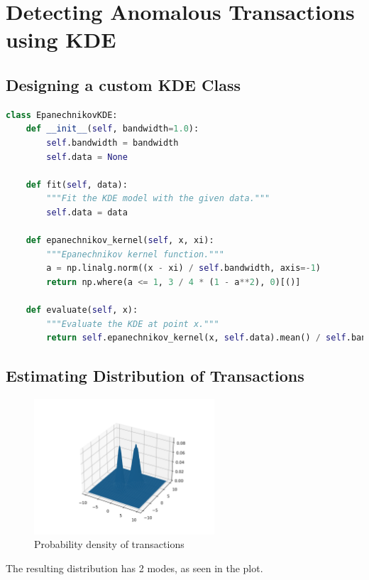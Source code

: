 \section{Detecting Anomalous Transactions using KDE}
\subsection{Designing a custom KDE Class}
\begin{lstlisting}[language=Python, caption={Python code to implement \texttt{EpanechnikovKDE} class}, label=lst:epanechnikovkde]
class EpanechnikovKDE:
    def __init__(self, bandwidth=1.0):
        self.bandwidth = bandwidth
        self.data = None

    def fit(self, data):
        """Fit the KDE model with the given data."""
        self.data = data

    def epanechnikov_kernel(self, x, xi):
        """Epanechnikov kernel function."""
        a = np.linalg.norm((x - xi) / self.bandwidth, axis=-1)
        return np.where(a <= 1, 3 / 4 * (1 - a**2), 0)[()]

    def evaluate(self, x):
        """Evaluate the KDE at point x."""
        return self.epanechnikov_kernel(x, self.data).mean() / self.bandwidth
\end{lstlisting}

\subsection{Estimating Distribution of Transactions}
\vspace{-20pt}
\begin{figure}[H]
	\centering
	\includegraphics[width=0.6\textwidth]{images/transaction_distribution.png}
	\caption{Probability density of transactions}
\end{figure}
The resulting distribution has 2 modes, as seen in the plot.
